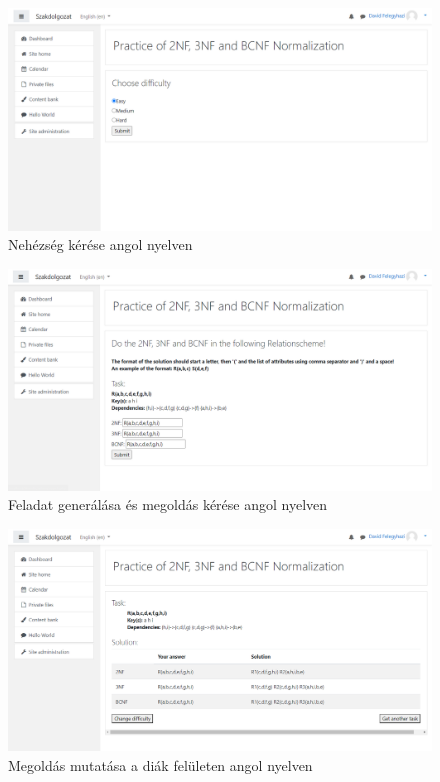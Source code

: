 \begin{figure}
    \centering
    \includegraphics[scale=0.4]{Fejezetek/Images/english01.png}
    \caption{Nehézség kérése angol nyelven}
\end{figure}
\begin{figure}
    \centering
    \includegraphics[scale=0.4]{Fejezetek/Images/english02.png}
    \caption{Feladat generálása és megoldás kérése angol nyelven}
\end{figure}
\begin{figure}
    \centering
    \includegraphics[scale=0.4]{Fejezetek/Images/english03.png}
    \caption{Megoldás mutatása a diák felületen angol nyelven}
\end{figure}
